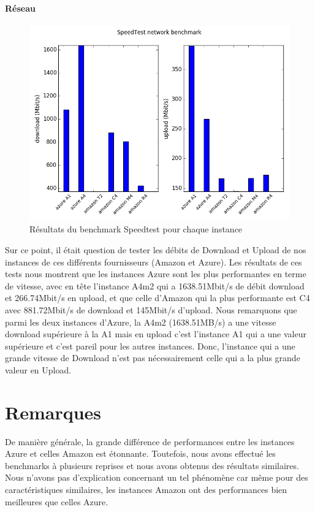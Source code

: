 \paragraph{Réseau}

\begin{figure}[h]
  \begin{center}
    \includegraphics[width=\textwidth]{plot_network.png}
    \caption{Résultats du benchmark Speedtest pour chaque instance}
    \label{fig:reseau}
  \end{center}
\end{figure}

Sur ce point, il était question de tester les débits de Download et Upload de nos instances de ces différents fournisseurs (Amazon et Azure). Les résultats de ces tests nous montrent que les instances Azure sont les plus performantes en terme de vitesse, avec en tête l’instance A4m2 qui a 1638.51Mbit/s de débit download et 266.74Mbit/s en upload, et que celle d’Amazon qui la plus performante est C4 avec 881.72Mbit/s de download et 145Mbit/s d’upload.
Nous remarquons que parmi les deux instances d’Azure, la A4m2 (1638.51MB/s) a une vitesse download supérieure à la A1 mais en upload c’est l’instance A1 qui a une valeur supérieure et c’est pareil pour les autres instances. Donc, l’instance qui a une grande vitesse de Download n’est pas nécessairement celle qui a la plus grande valeur en Upload.


\section{Remarques} 

De manière générale, la grande différence de performances entre les instances Azure et celles Amazon est étonnante. Toutefois, nous avons effectué les benchmarks à plusieurs reprises et nous avons obtenus des résultats similaires. Nous n'avons pas d'explication concernant un tel phénomène car même pour des caractéristiques similaires, les instances Amazon ont des performances bien meilleures que celles Azure.